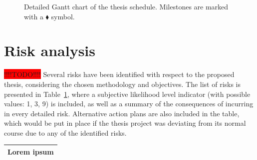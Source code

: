 \documentclass[a4paper,fontsize=11pt,bibliography=totoc]{scrartcl}
\newcommand{\tref}[1]{Table~\ref{#1}}
\begin{document}
\begin{landscape}
\begin{figure}
\centering
{\setlength{\fboxsep}{0pt}}
\caption{Detailed Gantt chart of the thesis schedule. Milestones are marked with a $\blacklozenge$ symbol.}
\label{f:gantt}
\end{figure}
\end{landscape}

\section{Risk analysis}
\colorbox{red}{!!!!TODO!!!!}
Several risks have been identified with respect to the proposed thesis, considering the chosen methodology and objectives. The list of risks is presented in \tref{t:risks}, where a subjective likelihood level indicator (with possible values: 1, 3, 9) is included, as well as a summary of the consequences of incurring in every detailed risk. Alternative action plans are also included in the table, which would be put in place if the thesis project was deviating from its normal course due to any of the identified risks.

\begin{table}
	\begin{tabular}{l}
	\toprule
	Lorem ipsum\\
	\bottomrule
	\end{tabular}
\label{t:risks}
\end{table}

\printbibliography
\end{document}
